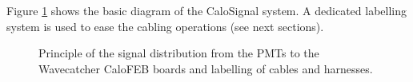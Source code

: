 \documentclass[12pt,a4paper]{article}
\newcommand{\pdftextimgpath}{./pdftex_t}
\begin{document}
\noindent\par Figure \ref{fig:calosignal:principle:1}  shows the basic
diagram of the CaloSignal system. A dedicated labelling system is used
to ease the cabling operations (see next sections).

\begin{figure}[h!]
  \begin{center}
    \scalebox{0.75}{}
  \end{center}
  \caption{Principle of the  signal distribution from the  PMTs to the
    Wavecatcher CaloFEB boards and labelling of cables and harnesses.}
  \label{fig:calosignal:principle:1}
\end{figure}

\clearpage





\end{document}
